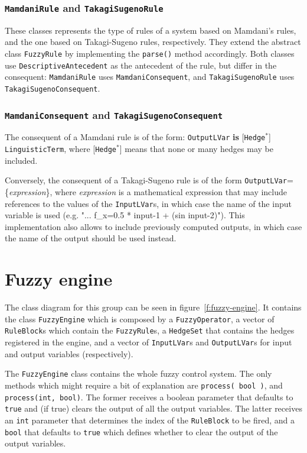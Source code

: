 		\subsubsection{\texttt{MamdaniRule} and \texttt{TakagiSugenoRule}}
			These classes represents the type of rules of a system based on Mamdani's rules, and the one based on Takagi-Sugeno rules, respectively. They extend the abstract class \texttt{FuzzyRule} by implementing the \texttt{parse()} method accordingly. Both classes use \texttt{DescriptiveAntecedent} as the antecedent of the rule, but differ in the consequent: \texttt{MamdaniRule} uses \texttt{MamdaniConsequent}, and \texttt{TakagiSugenoRule} uses \texttt{TakagiSugenoConsequent}.
			
		\subsubsection{\texttt{MamdaniConsequent} and \texttt{TakagiSugenoConsequent}}
			The consequent of a Mamdani rule is of the form: \texttt{OutputLVar} \textbf{is} [\texttt{Hedge}$^*$] \texttt{LinguisticTerm}, where [\texttt{Hedge}$^*$] means that none or many hedges may be included.
			
			Conversely, the consequent of a Takagi-Sugeno rule is of the form \texttt{OutputLVar}=\{\emph{expression}\}, where \emph{expression} is a mathematical expression that may include references to the values of the \texttt{InputLVar}s, in which case the name of the input variable is used (e.g. "... f\_x=0.5 * input-1 + (sin input-2)"). This implementation also allows to include previously computed outputs, in which case the name of the output should be used instead.
	
	\section{Fuzzy engine}
		The class diagram for this group can be seen in figure~\ref{f:fuzzy-engine}. It contains the class \texttt{FuzzyEngine} which is composed by a \texttt{FuzzyOperator}, a vector of \texttt{RuleBlock}s which contain the \texttt{FuzzyRule}s, a \texttt{HedgeSet} that contains the hedges registered in the engine, and a vector of \texttt{InputLVar}s and \texttt{OutputLVar}s for input and output variables (respectively).
		
		The \texttt{FuzzyEngine} class contains the whole fuzzy control system. The only methods which might require a bit of explanation are \texttt{process( bool )}, and \texttt{process(int, bool)}. The former receives a boolean parameter that defaults to \texttt{true} and (if true) clears the output of all the output variables. The latter receives an \texttt{int} parameter that determines the index of the \texttt{RuleBlock} to be fired, and a \texttt{bool} that defaults to \texttt{true} which defines whether to clear the output of the output variables.
		
